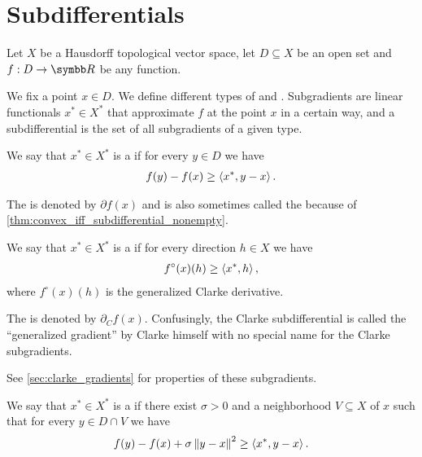 \section{Subdifferentials}\label{sec:subdifferentials}

Let $X$ be a Hausdorff topological vector space, let $D \subseteq X$ be an open set and $f: D \to \BB{R}$ be any function.

\begin{definition}\label{def:subdifferentials}
  We fix a point $x \in D$. We define different types of  and . Subgradients are linear functionals $x^* \in X^*$ that approximate $f$ at the point $x$ in a certain way, and a subdifferential is the set of all subgradients of a given type.

  \begin{defenum}
    \item\label{def:subdifferentials/convex}\cite[59]{Clarke2013} We say that $x^* \in X^*$ is a  if for every $y \in D$ we have
    \begin{align*}
      f(y) - f(x) \geq \left\langle x^*, y - x \right\rangle.
    \end{align*}

    The  is denoted by $\partial f(x)$ and is also sometimes called the  because of \cref{thm:convex_iff_subdifferential_nonempty}.

    \item\label{def:subdifferentials/clarke}\cite[definition 10.3]{Clarke2013} We say that $x^* \in X^*$ is a  if for every direction $h \in X$ we have
    \begin{align*}
      f^\circ(x)(h) \geq \left\langle x^*, h \right\rangle,
    \end{align*}
    where $f^\circ(x)(h)$ is the generalized Clarke derivative.

    The  is denoted by $\partial_C f(x)$. Confusingly, the Clarke subdifferential is called the \enquote{generalized gradient} by Clarke himself with no special name for the Clarke subgradients.

    See \cref{sec:clarke_gradients} for properties of these subgradients.

    \item\label{def:subdifferentials/proximal}\cite[227]{Clarke2013} We say that $x^* \in X^*$ is a  if there exist $\sigma > 0$ and a neighborhood $V \subseteq X$ of $x$ such that for every $y \in D \cap V$ we have
    \begin{align*}
      f(y) - f(x) + \sigma \left\Vert y - x \right\Vert^2 \geq \left\langle x^*, y - x \right\rangle.
    \end{align*}


\end{defenum}
\end{definition}
